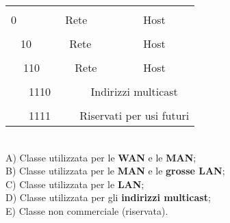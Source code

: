             
            \begin{tabular}{|l|l|l|l|l|l|l|l|l|l|l|l|l|l|l|l|l|l|l|l|l|l|l|l|l|l|l|l|l|l|l|l|}
                \hline
                & & & & & & & & & & & & & & & & & & & & & & & & & & & & & & & \\
                \hline
                \multicolumn{32}{l}{} \\
                \hline
                0 & \multicolumn{7}{|c|}{Rete} & \multicolumn{24}{|c|}{Host} \\
                \hline
                \multicolumn{32}{l}{} \\
                \hline
                \multicolumn{2}{|c|}{10} & \multicolumn{14}{|c|}{Rete} & \multicolumn{16}{|c|}{Host} \\
                \hline
                \multicolumn{32}{l}{} \\
                \hline
                \multicolumn{3}{|c|}{110} & \multicolumn{21}{|c|}{Rete} & \multicolumn{8}{|c|}{Host} \\
                \hline
                \multicolumn{32}{l}{} \\
                \hline
                \multicolumn{4}{|c|}{1110} & \multicolumn{28}{|c|}{Indirizzi multicast} \\
                \hline
                \multicolumn{32}{l}{} \\
                \hline
                \multicolumn{4}{|c|}{1111} & \multicolumn{28}{|c|}{Riservati per usi futuri} \\
                \hline
            \end{tabular}\\
            
            A) Classe utilizzata per le \textbf{WAN} e le \textbf{MAN};\\
            B) Classe utilizzata per le \textbf{MAN} e le \textbf{grosse LAN};\\
            C) Classe utilizzata per le \textbf{LAN};\\
            D) Classe utilizzata per gli \textbf{indirizzi multicast};\\
            E) Classe non commerciale (riservata).

